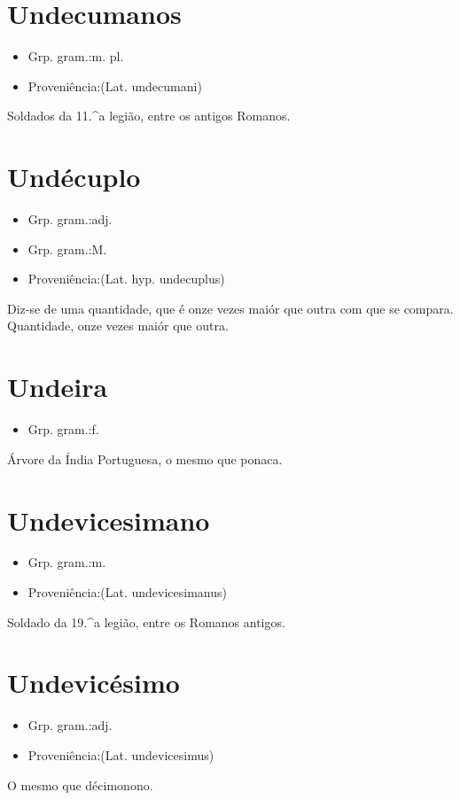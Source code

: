 \documentclass{article}
\begin{document}
\section{Undecumanos}
\begin{itemize}
\item {Grp. gram.:m. pl.}
\end{itemize}
\begin{itemize}
\item {Proveniência:(Lat. \textunderscore undecumani\textunderscore )}
\end{itemize}
Soldados da 11.^a legião, entre os antigos Romanos.
\section{Undécuplo}
\begin{itemize}
\item {Grp. gram.:adj.}
\end{itemize}
\begin{itemize}
\item {Grp. gram.:M.}
\end{itemize}
\begin{itemize}
\item {Proveniência:(Lat. hyp. \textunderscore undecuplus\textunderscore )}
\end{itemize}
Diz-se de uma quantidade, que é onze vezes maiór que outra com que se compara.
Quantidade, onze vezes maiór que outra.
\section{Undeira}
\begin{itemize}
\item {Grp. gram.:f.}
\end{itemize}
Árvore da Índia Portuguesa, o mesmo que \textunderscore ponaca\textunderscore .
\section{Undevicesimano}
\begin{itemize}
\item {Grp. gram.:m.}
\end{itemize}
\begin{itemize}
\item {Proveniência:(Lat. \textunderscore undevicesimanus\textunderscore )}
\end{itemize}
Soldado da 19.^a legião, entre os Romanos antigos.
\section{Undevicésimo}
\begin{itemize}
\item {Grp. gram.:adj.}
\end{itemize}
\begin{itemize}
\item {Proveniência:(Lat. \textunderscore undevicesimus\textunderscore )}
\end{itemize}
O mesmo que \textunderscore décimonono\textunderscore .
\end{document}
